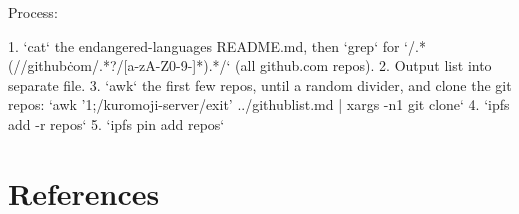 \documentclass[10pt, a4paper]{article}
\begin{document}
Process:

1. `cat` the endangered-languages README.md, then `grep` for `/.*(//github\.com/.*?/[a-zA-Z0-9-]*).*/` (all github.com repos).
2. Output list into separate file.
3. `awk` the first few repos, until a random divider, and clone the git repos: `awk '1;/kuromoji-server/{exit}' ../githublist.md | xargs -n1 git clone`
4. `ipfs add -r repos`
5. `ipfs pin add repos`

\section{References}
%




\end{document}
